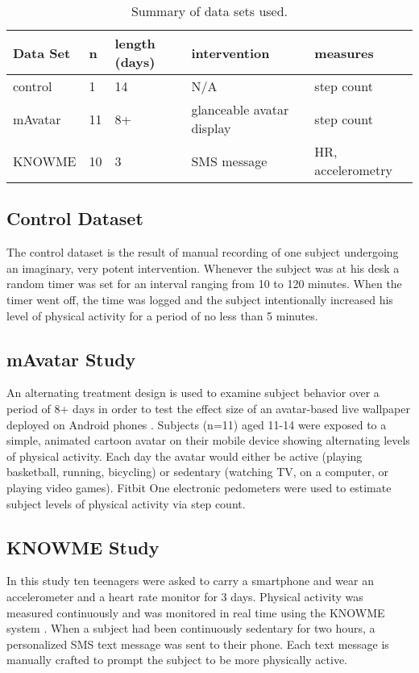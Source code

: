 \noindent
\begin{table}
\resizebox{\columnwidth}{!} {
    \begin{tabular}{ l       |      l  |  p{1cm}      | l | l }
		  Data Set        & n  & length (days) & intervention    & measures \\
		  \hline
		  control         & 1  & 14 & N/A                       & step count         \\
		  mAvatar         & 11 & 8+ & glanceable avatar display & step count         \\
		  KNOWME          & 10 & 3  & SMS message               & HR, accelerometry  \\
    \end{tabular}
}
\caption {Summary of data sets used.}
\end{table}

\subsection{Control Dataset}
The control dataset is the result of manual recording of one subject undergoing an imaginary, very potent intervention.
Whenever the subject was at his desk a random timer was set for an interval ranging from 10 to 120 minutes.
When the timer went off, the time was logged and the subject intentionally increased his level of physical activity for a period of no less than 5 minutes.

\subsection{mAvatar Study}
An alternating treatment design is used to examine subject behavior over a period of 8+ days in order to test the effect size of an avatar-based live wallpaper deployed on Android phones \cite{murray2013}.
Subjects (n=11) aged 11-14 were exposed to a simple, animated cartoon avatar on their mobile device showing alternating levels of physical activity.
Each day the avatar would either be active (playing basketball, running, bicycling) or sedentary (watching TV, on a computer, or playing video games).
Fitbit One electronic pedometers were used to estimate subject levels of physical activity via step count.

\subsection{KNOWME Study}
In this study ten teenagers were asked to carry a smartphone and wear an accelerometer and a heart rate monitor for 3 days.
Physical activity was measured continuously and was monitored in real time using the KNOWME system \cite{mitra2012}.
When a subject had been continuously sedentary for two hours, a personalized SMS text message was sent to their phone.
Each text message is manually crafted to prompt the subject to be more physically active.


